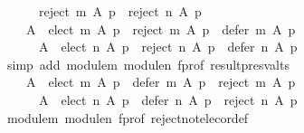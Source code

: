 \begin{isabellebody}
\ \ \ \ \ \ {\isacharparenleft}{\kern0pt}reject\ m\ A\ p{\isacharparenright}{\kern0pt}\ {\isasyminter}\ {\isacharparenleft}{\kern0pt}reject\ n\ A\ p{\isacharparenright}{\kern0pt}{\isachardoublequoteclose}\isanewline
%
\isadelimproof
%
\endisadelimproof
%
\isatagproof
{}\isamarkupfalse%
\ {\isacharminus}{\kern0pt}\isanewline
\ \ \isamarkupfalse%
\isanewline
\ \ \ \ {\isachardoublequoteopen}A\ {\isacharequal}{\kern0pt}\ {\isacharparenleft}{\kern0pt}elect\ m\ A\ p{\isacharparenright}{\kern0pt}\ {\isasymunion}\ {\isacharparenleft}{\kern0pt}reject\ m\ A\ p{\isacharparenright}{\kern0pt}\ {\isasymunion}\ {\isacharparenleft}{\kern0pt}defer\ m\ A\ p{\isacharparenright}{\kern0pt}\ {\isasymand}\isanewline
\ \ \ \ \ \ A\ {\isacharequal}{\kern0pt}\ {\isacharparenleft}{\kern0pt}elect\ n\ A\ p{\isacharparenright}{\kern0pt}\ {\isasymunion}\ {\isacharparenleft}{\kern0pt}reject\ n\ A\ p{\isacharparenright}{\kern0pt}\ {\isasymunion}\ {\isacharparenleft}{\kern0pt}defer\ n\ A\ p{\isacharparenright}{\kern0pt}{\isachardoublequoteclose}\isanewline
\ \ \ \ \isamarkupfalse%
\ {\isacharparenleft}{\kern0pt}simp\ add{\isacharcolon}{\kern0pt}\ module{\isacharunderscore}{\kern0pt}m\ module{\isacharunderscore}{\kern0pt}n\ f{\isacharunderscore}{\kern0pt}prof\ result{\isacharunderscore}{\kern0pt}presv{\isacharunderscore}{\kern0pt}alts{\isacharparenright}{\kern0pt}\isanewline
\ \ \isamarkupfalse%
\isanewline
\ \ \ \ {\isachardoublequoteopen}A\ {\isacharminus}{\kern0pt}\ {\isacharparenleft}{\kern0pt}{\isacharparenleft}{\kern0pt}elect\ m\ A\ p{\isacharparenright}{\kern0pt}\ {\isasymunion}\ {\isacharparenleft}{\kern0pt}defer\ m\ A\ p{\isacharparenright}{\kern0pt}{\isacharparenright}{\kern0pt}\ {\isacharequal}{\kern0pt}\ {\isacharparenleft}{\kern0pt}reject\ m\ A\ p{\isacharparenright}{\kern0pt}\ {\isasymand}\isanewline
\ \ \ \ \ \ A\ {\isacharminus}{\kern0pt}\ {\isacharparenleft}{\kern0pt}{\isacharparenleft}{\kern0pt}elect\ n\ A\ p{\isacharparenright}{\kern0pt}\ {\isasymunion}\ {\isacharparenleft}{\kern0pt}defer\ n\ A\ p{\isacharparenright}{\kern0pt}{\isacharparenright}{\kern0pt}\ {\isacharequal}{\kern0pt}\ {\isacharparenleft}{\kern0pt}reject\ n\ A\ p{\isacharparenright}{\kern0pt}{\isachardoublequoteclose}\isanewline
\ \ \ \ \isamarkupfalse%
\ module{\isacharunderscore}{\kern0pt}m\ module{\isacharunderscore}{\kern0pt}n\ f{\isacharunderscore}{\kern0pt}prof\ reject{\isacharunderscore}{\kern0pt}not{\isacharunderscore}{\kern0pt}elec{\isacharunderscore}{\kern0pt}or{\isacharunderscore}{\kern0pt}def\isanewline
\ \ \ \ \isamarkupfalse%

\end{isabellebody}
